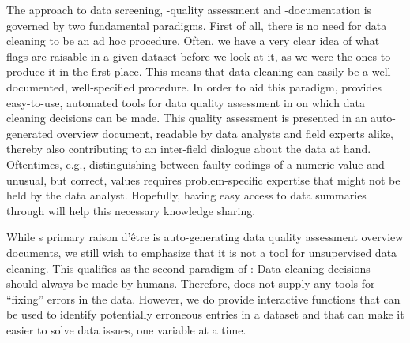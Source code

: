 \documentclass[article,shortnames]{jss}
\begin{document}
The  approach to data screening, -quality assessment and
-documentation is governed by two fundamental paradigms. First of all,
there is no need for data cleaning to be an ad hoc procedure. Often,
we have a very clear idea of what flags are raisable in a given
dataset before we look at it, as we were the ones to produce it in the
first place. This means that data cleaning can easily be a
well-documented, well-specified procedure. In order to aid this
paradigm,  provides easy-to-use, automated tools for
data quality assessment in  \citep{R} on which data
cleaning decisions can be made. This quality assessment is presented
in an auto-generated overview document, readable by data analysts and
field experts alike, thereby also contributing to an inter-field
dialogue about the data at hand. Oftentimes, e.g., distinguishing
between faulty codings of a numeric value and unusual, but correct,
values requires problem-specific expertise that might not be held by
the data analyst. Hopefully, having easy access to data summaries
through  will help this necessary knowledge sharing.

While s primary raison d'être is auto-generating data
quality assessment overview documents, we still wish to emphasize that
it is not a tool for unsupervised data cleaning. This qualifies
as the second paradigm of : Data cleaning decisions
should always be made by humans. Therefore,  does not
supply any tools for ``fixing'' errors in the data. However, we do
provide interactive functions that can be used to identify potentially
erroneous entries in a dataset and that can make it easier to solve
data issues, one variable at a time.
\end{document}
